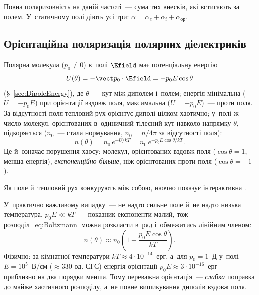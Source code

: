 Повна поляризовність на даній частоті~--- сума тих внесків, які встигають за полем.
У~статичному полі діють усі три: $\alpha = \alpha_e + \alpha_i + \alpha_\text{ор}$.


\subsection*{Орієнтаційна поляризація полярних діелектриків}\label{sec:Langevin-Debye}


Полярна молекула ($p_0\neq0$) в~полі $\Efield$ має потенціальну енергію
\begin{equation*}
	U(\theta) = -\vect p_0\cdot\Efield = -p_0 E\cos\theta
\end{equation*}
(\S~\ref{sec:DipoleEnergy}), де $\theta$~--- кут між диполем і~полем; енергія мінімальна
($U=-p_0E$) при орієнтації вздовж поля, максимальна ($U=+p_0E$)~--- проти поля. За
відсутності поля тепловий рух орієнтує диполі цілком хаотично; у~полі ж число молекул,
орієнтованих в~одиничний тілесний кут навколо напрямку $\theta$, підкоряється
 ($n_0$~--- стала нормування, $n_0 = n/4\pi$ за відсутності поля):
\begin{equation}\label{eq:Boltzmann}
	n(\theta) = n_0\, e^{-U/kT} = n_0\, e^{+p_0 E\cos\theta / kT}.
\end{equation}
Це й~означає порушення хаосу: молекул, орієнтованих вздовж поля ($\cos\theta=1$, менша
енергія), \emph{експоненційно більше}, ніж орієнтованих проти поля ($\cos\theta=-1$).

\begin{Simulation}
Як поле й~тепловий рух конкурують між собою, наочно
показує інтерактивна
.
\end{Simulation}

У~практично важливому випадку~--- не надто сильне поле й~не надто низька температура,
$p_0E \ll kT$~--- показник експоненти малий, тож розподіл~\eqref{eq:Boltzmann} можна
розкласти в~ряд і~обмежитись лінійним членом:
\begin{equation}\label{eq:BoltzmannLinear}
	n(\theta) \approx n_0\left(1 + \frac{p_0 E \cos\theta}{kT}\right).
\end{equation}
Фізично: за кімнатної температури $kT \approx 4\cdot10^{-14}$~ерг, а~для $p_0 = 1$~Д
у~полі $E = 10^5$~В/см ($\approx 330$ од. СГС) енергія орієнтації $p_0E \approx
3\cdot10^{-16}$~ерг~--- приблизно на два порядки менша. Тому переважна орієнтація~--- \emph{слабка}
поправка до майже хаотичного розподілу, а~не повне вишикування диполів вздовж поля.

